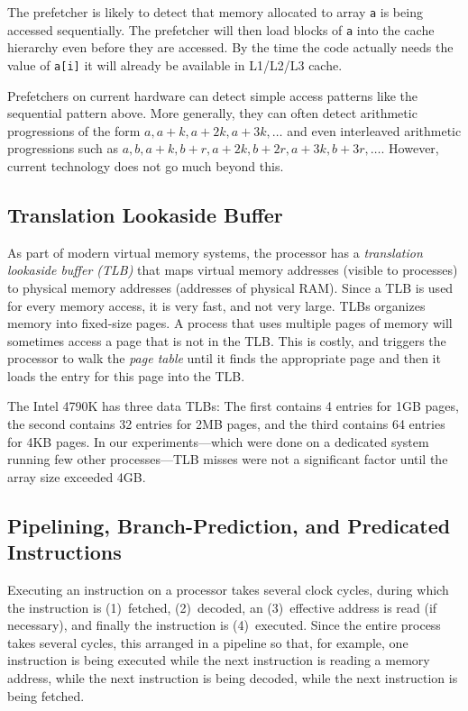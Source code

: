 \documentclass{patmorin}
\begin{document}
The prefetcher is likely to detect that memory allocated to array
\texttt{a} is being accessed sequentially.  The prefetcher will
then load blocks of \texttt{a} into the cache hierarchy even
before they are accessed.  By the time the code actually needs the value
of \texttt{a[i]} it will already be available in L1/L2/L3 cache.

Prefetchers on current hardware can detect simple access patterns
like the sequential pattern above.  More generally, they can often
detect arithmetic progressions of the form $a,a+k,a+2k,a+3k,\ldots$
and even interleaved arithmetic progressions such as $a, b, a+k, b+r,
a+2k,b+2r,a+3k,b+3r,\ldots$.  However, current technology does not go
much beyond this.

\subsection{Translation Lookaside Buffer}

As part of modern virtual memory systems, the processor has a
\emph{translation lookaside buffer (TLB)} that maps virtual memory
addresses (visible to processes) to physical memory addresses (addresses
of physical RAM).  Since a TLB is used for every memory access, it is very
fast, and not very large.  TLBs organizes memory into fixed-size pages.
A process that uses multiple pages of memory will sometimes access a
page that is not in the TLB. This is costly, and triggers the processor
to walk the \emph{page table} until it finds the appropriate page and
then it loads the entry for this page into the TLB.

The Intel 4790K has three data TLBs: The first contains 4 entries for
1GB pages, the second contains 32 entries for 2MB pages, and the third
contains 64 entries for 4KB pages.  In our experiments---which were done
on a dedicated system running few other processes---TLB misses were not
a significant factor until the array size exceeded 4GB.


\subsection{Pipelining, Branch-Prediction, and Predicated Instructions}

Executing an instruction on a processor takes several clock cycles, during
which the instruction is (1)~fetched, (2)~decoded, an (3)~effective
address is read (if necessary), and finally the instruction is
(4)~executed.  Since the entire process takes several cycles, this
arranged in a pipeline so that, for example, one instruction is being
executed while the next instruction is reading a memory address, while
the next instruction is being decoded, while the next instruction is
being fetched.
\end{document}
